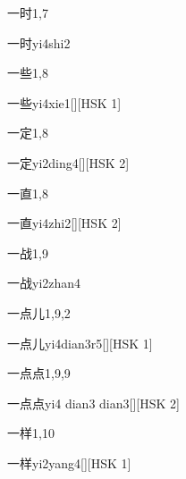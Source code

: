 \begin{entry}{一时}{1,7}
  \begin{phonetics}{一时}{yi4shi2}
  \end{phonetics}
\end{entry}

\begin{entry}{一些}{1,8}
  \begin{phonetics}{一些}{yi4xie1}[][HSK 1]
  \end{phonetics}
\end{entry}

\begin{entry}{一定}{1,8}
  \begin{phonetics}{一定}{yi2ding4}[][HSK 2]
  \end{phonetics}
\end{entry}

\begin{entry}{一直}{1,8}
  \begin{phonetics}{一直}{yi4zhi2}[][HSK 2]
  \end{phonetics}
\end{entry}

\begin{entry}{一战}{1,9}
  \begin{phonetics}{一战}{yi2zhan4}
  \end{phonetics}
\end{entry}

\begin{entry}{一点儿}{1,9,2}
  \begin{phonetics}{一点儿}{yi4dian3r5}[][HSK 1]
  \end{phonetics}
\end{entry}

\begin{entry}{一点点}{1,9,9}
  \begin{phonetics}{一点点}{yi4 dian3 dian3}[][HSK 2]
  \end{phonetics}
\end{entry}

\begin{entry}{一样}{1,10}
  \begin{phonetics}{一样}{yi2yang4}[][HSK 1]
  \end{phonetics}
\end{entry}


